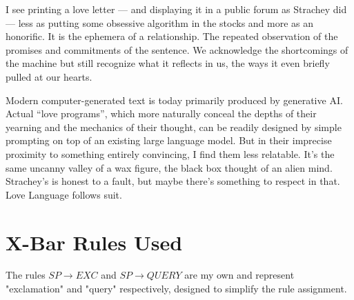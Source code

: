 \documentclass[runningheads]{llncs}
\begin{document}
I see printing a love letter — and displaying it in a public forum as Strachey did — less as putting some obsessive algorithm in the stocks and more as an honorific. It is the ephemera of a relationship. The repeated observation of the promises and commitments of the sentence. We acknowledge the shortcomings of the machine but still recognize what it reflects in us, the ways it even briefly pulled at our hearts.

Modern computer-generated text is today primarily produced by generative AI. Actual “love programs”, which more naturally conceal the depths of their yearning and the mechanics of their thought, can be readily designed by simple prompting on top of an existing large language model. But in their imprecise proximity to something entirely convincing, I find them less relatable. It’s the same uncanny valley of a wax figure, the black box thought of an alien mind. Strachey’s is honest to a fault, but maybe there’s something to respect in that. Love Language follows suit.



\newpage
\appendix
\section{X-Bar Rules Used} \label{app:xbar}
The rules $SP \rightarrow EXC$ and $SP \rightarrow QUERY$ are my own and represent "exclamation" and "query" respectively, designed to simplify the rule assignment.
\vspace{1em}
\end{document}

